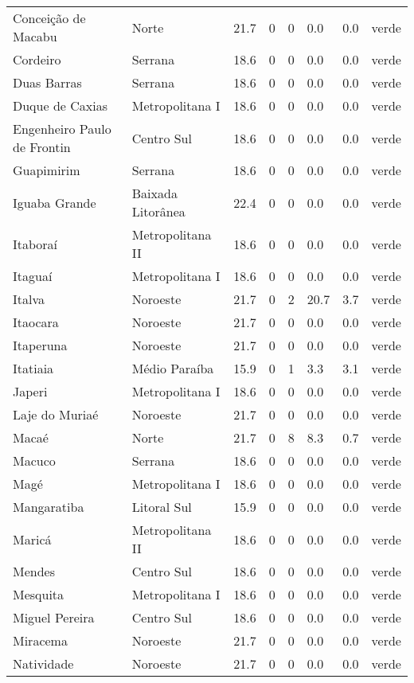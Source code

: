 \begin{longtable}{l|lllllll}
  Conceição de Macabu & Norte & 21.7 & 0 & 0 & 0.0 & 0.0 & verde \\ 
  Cordeiro & Serrana & 18.6 & 0 & 0 & 0.0 & 0.0 & verde \\ 
  Duas Barras & Serrana & 18.6 & 0 & 0 & 0.0 & 0.0 & verde \\ 
  Duque de Caxias & Metropolitana I & 18.6 & 0 & 0 & 0.0 & 0.0 & verde \\ 
  Engenheiro Paulo de Frontin & Centro Sul & 18.6 & 0 & 0 & 0.0 & 0.0 & verde \\ 
  Guapimirim & Serrana & 18.6 & 0 & 0 & 0.0 & 0.0 & verde \\ 
  Iguaba Grande & Baixada Litorânea & 22.4 & 0 & 0 & 0.0 & 0.0 & verde \\ 
  Itaboraí & Metropolitana II & 18.6 & 0 & 0 & 0.0 & 0.0 & verde \\ 
  Itaguaí & Metropolitana I & 18.6 & 0 & 0 & 0.0 & 0.0 & verde \\ 
  Italva & Noroeste & 21.7 & 0 & 2 & 20.7 & 3.7 & verde \\ 
  Itaocara & Noroeste & 21.7 & 0 & 0 & 0.0 & 0.0 & verde \\ 
  Itaperuna & Noroeste & 21.7 & 0 & 0 & 0.0 & 0.0 & verde \\ 
  Itatiaia & Médio Paraíba & 15.9 & 0 & 1 & 3.3 & 3.1 & verde \\ 
  Japeri & Metropolitana I & 18.6 & 0 & 0 & 0.0 & 0.0 & verde \\ 
  Laje do Muriaé & Noroeste & 21.7 & 0 & 0 & 0.0 & 0.0 & verde \\ 
  Macaé & Norte & 21.7 & 0 & 8 & 8.3 & 0.7 & verde \\ 
  Macuco & Serrana & 18.6 & 0 & 0 & 0.0 & 0.0 & verde \\ 
  Magé & Metropolitana I & 18.6 & 0 & 0 & 0.0 & 0.0 & verde \\ 
  Mangaratiba & Litoral Sul & 15.9 & 0 & 0 & 0.0 & 0.0 & verde \\ 
  Maricá & Metropolitana II & 18.6 & 0 & 0 & 0.0 & 0.0 & verde \\ 
  Mendes & Centro Sul & 18.6 & 0 & 0 & 0.0 & 0.0 & verde \\ 
  Mesquita & Metropolitana I & 18.6 & 0 & 0 & 0.0 & 0.0 & verde \\ 
  Miguel Pereira & Centro Sul & 18.6 & 0 & 0 & 0.0 & 0.0 & verde \\ 
  Miracema & Noroeste & 21.7 & 0 & 0 & 0.0 & 0.0 & verde \\ 
  Natividade & Noroeste & 21.7 & 0 & 0 & 0.0 & 0.0 & verde \\ 

\end{longtable}
